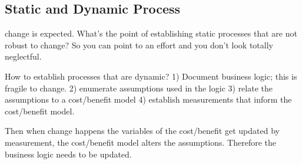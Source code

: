 \subsection{Static and Dynamic Process}


change is expected. What's the point of establishing static processes that are not robust to change?
So you can point to an effort and you don't look totally neglectful.

How to establish processes that are dynamic?
1) Document business logic; this is fragile to change.
2) enumerate assumptions used in the logic
3) relate the assumptions to a cost/benefit model
4) establish measurements that inform the cost/benefit model.

Then when change happens the variables of the cost/benefit get updated by measurement, the cost/benefit model alters the assumptions. Therefore the business logic needs to be updated.